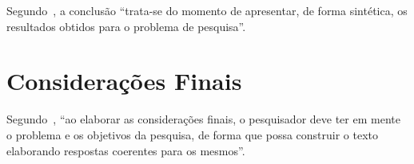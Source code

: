 \documentclass[chapter=TITLE,section=Title,espaco=duplo,tocpage=plain,appendix=Name,floatnumber=continuous]{abnt}
\begin{document}
Segundo~\cite{normasUTP}, a conclusão “trata-se do momento de apresentar,
de forma sintética, os resultados obtidos para o problema de pesquisa”.

\chapter{Considerações Finais}

Segundo~\cite{normasUTP}, “ao elaborar as considerações finais, o
pesquisador deve ter em mente o problema e os objetivos da pesquisa, de
forma que possa construir o texto elaborando respostas coerentes para os
mesmos”.


\end{document}

